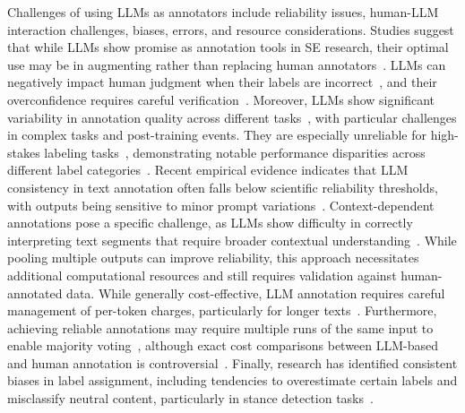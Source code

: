 Challenges of using LLMs as annotators include reliability issues, human-LLM interaction challenges, biases, errors, and resource considerations.
Studies suggest that while LLMs show promise as annotation tools in SE research, their optimal use may be in augmenting rather than replacing human annotators~\cite{DBLP:conf/emnlp/WangLXZZ21, DBLP:conf/chi/HeHDRH24}. %
LLMs can negatively impact human judgment when their labels are incorrect~\cite{DBLP:conf/www/HuangKA23a}, and their overconfidence requires careful verification~\cite{DBLP:conf/kdd/WanSJKCNSSWYABJ24}.
Moreover, LLMs show significant variability in annotation quality across different tasks~\cite{DBLP:conf/www/HuangKA23a,DBLP:conf/chi/Wang0RMM24, DBLP:journals/corr/abs-2306-00176}, with particular challenges in complex tasks and post-training events. They are especially unreliable for high-stakes labeling tasks~\cite{DBLP:conf/chi/Wang0RMM24}, demonstrating notable performance disparities across different label categories~\cite{DBLP:journals/corr/abs-2304-10145}. Recent empirical evidence indicates that LLM consistency in text annotation often falls below scientific reliability thresholds, with outputs being sensitive to minor prompt variations~\cite{DBLP:journals/corr/abs-2304-11085}.
Context-dependent annotations pose a specific challenge, as LLMs show difficulty in correctly interpreting text segments that require broader contextual understanding~\cite{DBLP:conf/chi/HeHDRH24}.
While pooling multiple outputs can improve reliability, this approach necessitates additional computational resources and still requires validation against human-annotated data.
While generally cost-effective, LLM annotation requires careful management of per-token charges, particularly for longer texts~\cite{DBLP:conf/emnlp/WangLXZZ21}. Furthermore, achieving reliable annotations may require multiple runs of the same input to enable majority voting~\cite{DBLP:journals/corr/abs-2304-11085}, although exact cost comparisons between LLM-based and human annotation is controversial~\cite{DBLP:conf/chi/HeHDRH24}.
Finally, research has identified consistent biases in label assignment, including tendencies to overestimate certain labels and misclassify neutral content, particularly in stance detection tasks~\cite{DBLP:journals/corr/abs-2304-10145}. %


